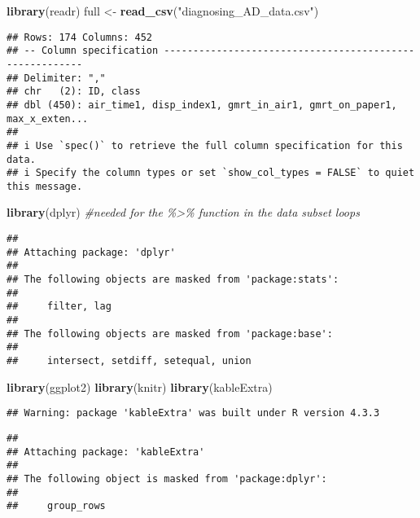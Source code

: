 \documentclass[
]{article}
\author{}
\date{\vspace{-2.5em}}
\newenvironment{Shaded}{\begin{snugshade}}{\end{snugshade}}
\newcommand{\CommentTok}[1]{\textcolor[rgb]{0.56,0.35,0.01}{\textit{#1}}}
\newcommand{\FunctionTok}[1]{\textcolor[rgb]{0.13,0.29,0.53}{\textbf{#1}}}
\newcommand{\NormalTok}[1]{#1}
\newcommand{\OtherTok}[1]{\textcolor[rgb]{0.56,0.35,0.01}{#1}}
\newcommand{\StringTok}[1]{\textcolor[rgb]{0.31,0.60,0.02}{#1}}
\begin{document}
\begin{Shaded}
\begin{Highlighting}[]
\FunctionTok{library}\NormalTok{(readr)}
\NormalTok{full }\OtherTok{\textless{}{-}} \FunctionTok{read\_csv}\NormalTok{(}\StringTok{"diagnosing\_AD\_data.csv"}\NormalTok{)}
\end{Highlighting}
\end{Shaded}

\begin{verbatim}
## Rows: 174 Columns: 452
## -- Column specification --------------------------------------------------------
## Delimiter: ","
## chr   (2): ID, class
## dbl (450): air_time1, disp_index1, gmrt_in_air1, gmrt_on_paper1, max_x_exten...
## 
## i Use `spec()` to retrieve the full column specification for this data.
## i Specify the column types or set `show_col_types = FALSE` to quiet this message.
\end{verbatim}

\begin{Shaded}
\begin{Highlighting}[]
\FunctionTok{library}\NormalTok{(dplyr) }\CommentTok{\#needed for the \%\textgreater{}\% function in the data subset loops}
\end{Highlighting}
\end{Shaded}

\begin{verbatim}
## 
## Attaching package: 'dplyr'
## 
## The following objects are masked from 'package:stats':
## 
##     filter, lag
## 
## The following objects are masked from 'package:base':
## 
##     intersect, setdiff, setequal, union
\end{verbatim}

\begin{Shaded}
\begin{Highlighting}[]
\FunctionTok{library}\NormalTok{(ggplot2)}
\FunctionTok{library}\NormalTok{(knitr)}
\FunctionTok{library}\NormalTok{(kableExtra)}
\end{Highlighting}
\end{Shaded}

\begin{verbatim}
## Warning: package 'kableExtra' was built under R version 4.3.3
\end{verbatim}

\begin{verbatim}
## 
## Attaching package: 'kableExtra'
## 
## The following object is masked from 'package:dplyr':
## 
##     group_rows
\end{verbatim}
\end{document}
